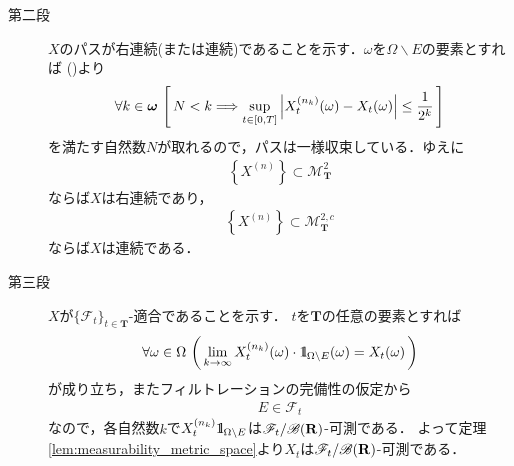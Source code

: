 \begin{sketch}
\begin{description}
			\item[第二段]
				$X$のパスが右連続(または連続)であることを示す．$\omega$を$\Omega \backslash E$の要素とすれば
				()より
				\begin{align}
					\forall k \in {\boldsymbol \omega}\,
					\left[\, N < k \Longrightarrow \operatorname*{sup}_{t \in [0,T]} \left|X_t^{(n_k)}(\omega) - X_t(\omega)\right| \leq \frac{1}{2^k}\, \right]
				\end{align}
				を満たす自然数$N$が取れるので，パスは一様収束している．ゆえに
				\begin{align}
					\left\{X^{(n)}\right\} \subset \mathscr{M}^2_{\mathbf{T}}
				\end{align}
				ならば$X$は右連続であり，
				\begin{align}
					\left\{X^{(n)}\right\} \subset \mathscr{M}^{2,c}_{\mathbf{T}}
				\end{align}
				ならば$X$は連続である．
			
			\item[第三段]
				$X$が$\{\mathscr{F}_t\}_{t \in \mathbf{T}}$-適合であることを示す．
				$t$を$\mathbf{T}$の任意の要素とすれば
				\begin{align}
					\forall \omega \in \Omega\, \left(\, 
					\lim_{k \to \infty} X_t^{(n_k)}(\omega) \cdot \mbox{1}\hspace{-0.25em}\mbox{l}_{\Omega \backslash E}(\omega) = X_t(\omega)\, \right)
				\end{align}
				が成り立ち，またフィルトレーションの完備性の仮定から
				\begin{align}
					E \in \mathscr{F}_t
				\end{align}
				なので，各自然数$k$で$X_t^{(n_k)} \mbox{1}\hspace{-0.25em}\mbox{l}_{\Omega \backslash E}$は$\mathscr{F}_t/\mathscr{B}(\mathbf{R})$-可測である．
				よって定理\ref{lem:measurability_metric_space}より$X_t$は$\mathscr{F}_t/\mathscr{B}(\mathbf{R})$-可測である．
				

\end{description}
\end{sketch}
